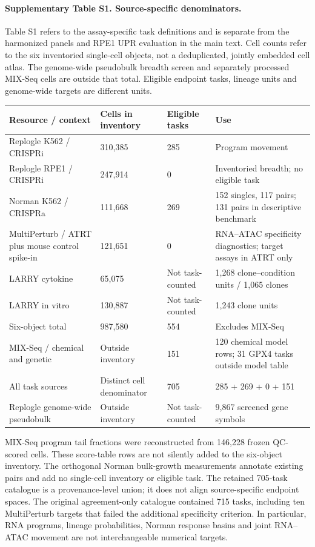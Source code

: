 \documentclass[a4paper,fleqn]{cas-sc}
\makeatletter
\DeclareRobustCommand{\rev}[1]{{\color{red}\def\@citecolor{black}\def\@linkcolor{red}\def\@urlcolor{red}#1}}
\makeatother
\begin{document}
\paragraph{Supplementary Table S1. Source-specific denominators.}
\rev{Table S1 refers to the assay-specific task definitions and is separate from the harmonized panels and RPE1 UPR evaluation in the main text.} Cell counts refer to the six inventoried single-cell objects, not a deduplicated, jointly embedded cell atlas. The genome-wide pseudobulk breadth screen and separately processed MIX-Seq cells are outside that total. Eligible endpoint tasks, lineage units and genome-wide targets are different units.
\begin{longtable}{p{}p{}p{}p{}}
\toprule
\rev{Resource / context} & \rev{Cells in inventory} & \rev{Eligible tasks} & \rev{Use}\\
\midrule
\endhead
\rev{Replogle K562 / CRISPRi} & \rev{310,385} & \rev{285} & \rev{Program movement}\\
\rev{Replogle RPE1 / CRISPRi} & \rev{247,914} & \rev{0} & \rev{Inventoried breadth; no eligible task}\\
\rev{Norman K562 / CRISPRa} & \rev{111,668} & \rev{269} & \rev{152 singles, 117 pairs; 131 pairs in descriptive benchmark}\\
\rev{MultiPerturb / ATRT plus mouse control spike-in} & \rev{121,651} & \rev{0} & \rev{RNA--ATAC specificity diagnostics; target assays in ATRT only}\\
\rev{LARRY cytokine} & \rev{65,075} & \rev{Not task-counted} & \rev{1,268 clone--condition units / 1,065 clones}\\
\rev{LARRY in vitro} & \rev{130,887} & \rev{Not task-counted} & \rev{1,243 clone units}\\
\rev{Six-object total} & \rev{987,580} & \rev{554} & \rev{Excludes MIX-Seq}\\
\rev{MIX-Seq / chemical and genetic} & \rev{Outside inventory} & \rev{151} & \rev{120 chemical model rows; 31 GPX4 tasks outside model table}\\
\rev{All task sources} & \rev{Distinct cell denominator} & \rev{705} & \rev{285 + 269 + 0 + 151}\\
\rev{Replogle genome-wide pseudobulk} & \rev{Outside inventory} & \rev{Not task-counted} & \rev{9,867 screened gene symbols}\\
\bottomrule
\end{longtable}
\rev{MIX-Seq program tail fractions were reconstructed from 146,228 frozen QC-scored cells.} These score-table rows are not silently added to the six-object inventory. The orthogonal Norman bulk-growth measurements annotate existing pairs and add no single-cell inventory or eligible task. \rev{The retained 705-task catalogue is a provenance-level union; it does not align source-specific endpoint spaces.} \rev{The original agreement-only catalogue contained 715 tasks, including ten MultiPerturb targets that failed the additional specificity criterion.} In particular, RNA programs, lineage probabilities, Norman response basins and joint RNA--ATAC movement are not interchangeable numerical targets.
\end{document}
